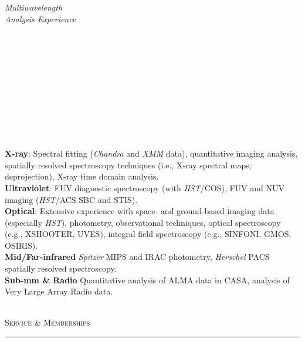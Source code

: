 \documentclass[11pt]{article}
\makeatletter
\def\vhrulefill#1{\leavevmode\leaders\hrule\@height#1\hfill \kern\z@}
\makeatother
\begin{document}
\hspace{2.5mm} \parbox{1.5in}{\textit{Multiwavelength \\ Analysis Experience \\\\\\\\\\\\\\\\\\\\\\}} \parbox{5.15in}{
\textbf{X-ray}: Spectral fitting (\textit{Chandra} and \textit{XMM} data), quantitative imaging analysis, spatially resolved spectroscopy techniques (i.e., X-ray spectral maps, deprojection), X-ray time domain analysis. \\
\textbf{Ultraviolet}: FUV diagnostic spectroscopy (with \textit{HST}/COS), FUV and NUV imaging (\textit{HST}/ACS SBC and STIS). \\
\textbf{Optical}: Extensive experience with space- and ground-based imaging data (especially \textit{HST}), photometry, observational techniques, optical spectroscopy (e.g., XSHOOTER, UVES),  integral field spectroscopy (e.g., SINFONI, GMOS, OSIRIS). \\
\textbf{Mid/Far-infrared} \textit{Spitzer} MIPS and IRAC photometry, \textit{Herschel} PACS spatially resolved spectroscopy.  \\
\textbf{Sub-mm \& Radio} Quantitative analysis of ALMA data in CASA, analysis of Very Large Array Radio data.  \\
}\\



\textsc{Service \& Memberships} \vhrulefill{0.4pt}



\vspace{4mm}
\end{document}
